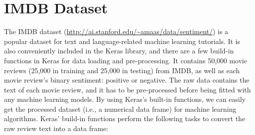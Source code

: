 \documentclass[
  12pt,
]{krantz}
\begin{document}
\hypertarget{imdb-dataset}{%
\section{IMDB Dataset}\label{imdb-dataset}}

The IMDB dataset (\url{http://ai.stanford.edu/~amaas/data/sentiment/}) is a popular dataset for text and language-related machine learning tutorials. It is also conveniently included in the Keras library, and there are a few build-in functions in Keras for data loading and pre-processing. It contains 50,000 movie reviews (25,000 in training and 25,000 in testing) from IMDB, as well as each movie review's binary sentiment: positive or negative. The raw data contains the text of each movie review, and it has to be pre-processed before being fitted with any machine learning models. By using Keras's built-in functions, we can easily get the processed dataset (i.e., a numerical data frame) for machine learning algorithms. Keras' build-in functions perform the following tasks to convert the raw review text into a data frame:
\end{document}
